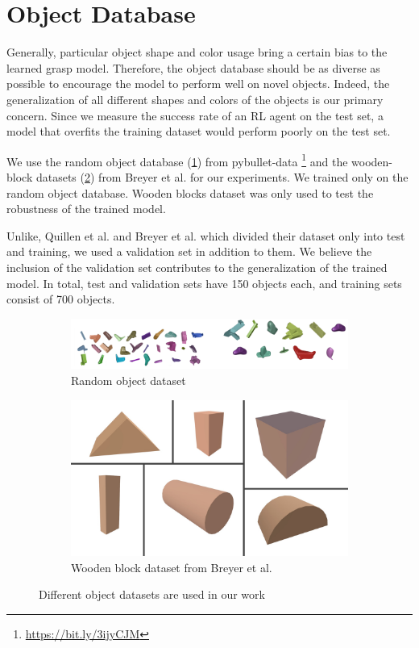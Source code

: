 \section{Object Database}

Generally, particular object shape and color usage bring a certain bias to the learned grasp model. Therefore, the object database should be as diverse as possible to encourage the model to perform well on novel objects. Indeed, the generalization of all different shapes and colors of the objects is our primary concern. Since we measure the success rate of an RL agent on the test set, a model that overfits the training dataset would perform poorly on the test set.

We use the random object database (\ref{fig:randomobj}) from pybullet-data \footnote{\url{https://bit.ly/3ijyCJM}} and the wooden-block datasets (\ref{fig:woodenobj}) from Breyer et al. for our experiments. We trained only on the random object database. Wooden blocks dataset was only used to test the robustness of the trained model.

Unlike, Quillen et al. and Breyer et al. which divided their dataset only into test and training, we used a validation set in addition to them.  We believe the inclusion of the validation set contributes to the generalization of the trained model. In total, test and validation sets have 150 objects each, and training sets consist of 700 objects.

\begin{figure}

    \begin{subfigure}{1.0\textwidth}
      \includegraphics[width=\linewidth]{figures/random_objects}
      \caption{Random object dataset} \label{fig:randomobj}
    \end{subfigure}%
    \hspace*{\fill}   %
    \newline
    \begin{subfigure}{1.0\textwidth}
      \centering
      \includegraphics[width=0.3\linewidth]{figures/wooden_blocks}
      \caption{Wooden block dataset from Breyer et al. \cite{Breyer2018}} \label{fig:woodenobj}
    \end{subfigure}%
    \hspace*{\fill}   %
\caption{ Different object datasets are used in our work \label{fig:objdatasets}}
\end{figure}